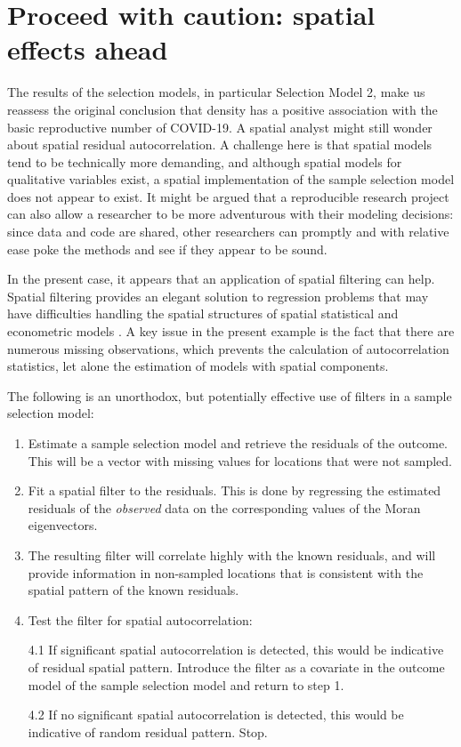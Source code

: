\documentclass[preprint, 3p,
authoryear]{elsarticle} %
\begin{document}
\hypertarget{proceed-with-caution-spatial-effects-ahead}{%
\section{Proceed with caution: spatial effects
ahead}\label{proceed-with-caution-spatial-effects-ahead}}

The results of the selection models, in particular Selection Model 2,
make us reassess the original conclusion that density has a positive
association with the basic reproductive number of COVID-19. A spatial
analyst might still wonder about spatial residual autocorrelation. A
challenge here is that spatial models tend to be technically more
demanding, and although spatial models for qualitative variables exist,
a spatial implementation of the sample selection model does not appear
to exist. It might be argued that a reproducible research project can
also allow a researcher to be more adventurous with their modeling
decisions: since data and code are shared, other researchers can
promptly and with relative ease poke the methods and see if they appear
to be sound.

In the present case, it appears that an application of spatial filtering
\citep[see][]{Getis2002comparative, Paez2019using, Griffith2004spatial}
can help. Spatial filtering provides an elegant solution to regression
problems that may have difficulties handling the spatial structures of
spatial statistical and econometric models \citep{Griffith2000linear}. A
key issue in the present example is the fact that there are numerous
missing observations, which prevents the calculation of autocorrelation
statistics, let alone the estimation of models with spatial components.

The following is an unorthodox, but potentially effective use of filters
in a sample selection model:

\begin{enumerate}
\def\labelenumi{\arabic{enumi}.}
\item
  Estimate a sample selection model and retrieve the residuals of the
  outcome. This will be a vector with missing values for locations that
  were not sampled.
\item
  Fit a spatial filter to the residuals. This is done by regressing the
  estimated residuals of the \emph{observed} data on the corresponding
  values of the Moran eigenvectors.
\item
  The resulting filter will correlate highly with the known residuals,
  and will provide information in non-sampled locations that is
  consistent with the spatial pattern of the known residuals.
\item
  Test the filter for spatial autocorrelation:

  4.1 If significant spatial autocorrelation is detected, this would be
  indicative of residual spatial pattern. Introduce the filter as a
  covariate in the outcome model of the sample selection model and
  return to step 1.

  4.2 If no significant spatial autocorrelation is detected, this would
  be indicative of random residual pattern. Stop.
\end{enumerate}
\end{document}
